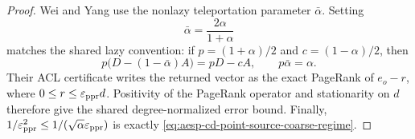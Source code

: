 \begin{proof}
Wei and Yang use the nonlazy teleportation parameter $\bar\alpha$.  Setting
\begin{equation*}
 \bar\alpha=\frac{2\alpha}{1+\alpha}
\end{equation*}
matches the shared lazy convention: if
$p=(1+\alpha)/2$ and $c=(1-\alpha)/2$, then
\begin{equation*}
 p\bigl(D-(1-\bar\alpha)A\bigr)=pD-cA,
 \qquad p\bar\alpha=\alpha.
\end{equation*}
Their ACL certificate writes the returned vector as the exact PageRank of
$e_o-r$, where $0\leq r\leq\varepsilon_{\mathrm{ppr}} d$.  Positivity of the PageRank operator
and stationarity on $d$ therefore give the shared degree-normalized error
bound.  Finally,
$1/\varepsilon_{\mathrm{ppr}}^2\leq1/(\sqrt\alpha\varepsilon_{\mathrm{ppr}})$ is exactly
\cref{eq:aesp-cd-point-source-coarse-regime}.
\end{proof}

